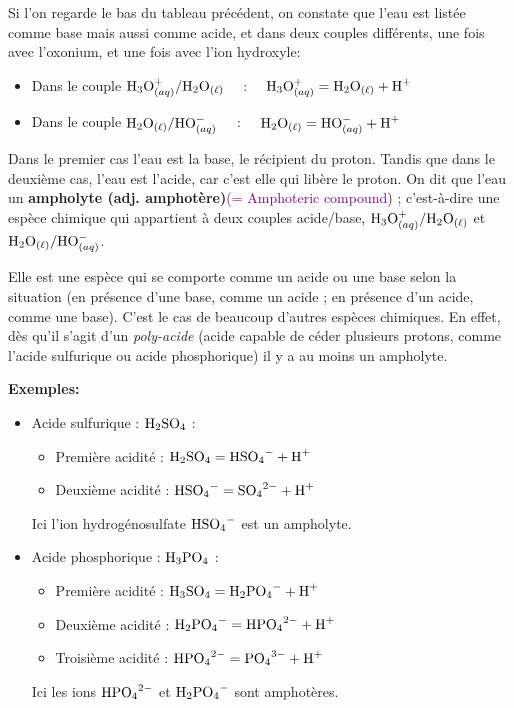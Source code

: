 \documentclass[11pt,a4paper]{article}
\newcommand{\eng}[1]{\textcolor{purple}{(= #1})}
\newcommand{\oxo}{\ce{H3O+}_{(aq)}}
\newcommand{\eau}{\ce{H2O}_{(\ell)}}
\newcommand{\OH}{\ce{HO-}_{(aq)}}
\newenvironment{eg}
 {\begin{shaded} \textbf{Exemples:} } { \end{shaded}}
\begin{document}
Si l'on regarde le bas du tableau précédent, on constate que l'eau est listée comme base mais aussi comme acide, et dans deux couples différents, une fois avec l'oxonium, et une fois avec l'ion hydroxyle: 

\begin{itemize}
    \item Dans le couple $ \oxo/\eau \quad$ : $\quad \oxo = \eau + \ce{H+}$
    \item Dans le couple $ \eau / \OH \quad $ : $\quad \eau = \OH + \ce{H+}$
\end{itemize}

Dans le premier cas l’eau est la base, le récipient du proton.  Tandis que dans le deuxième cas, l’eau est l’acide, car c’est elle qui libère le proton.  On dit que l’eau un \textbf{ampholyte (adj. amphotère)}\eng{Amphoteric compound} ;  c'est-à-dire une espèce chimique qui appartient à deux couples acide/base, $ \oxo/\eau$ et $ \eau / \OH$.  

Elle est une espèce qui se comporte comme un acide ou une base selon la situation (en présence d’une base, comme un acide ; en présence d’un acide, comme une base). C'est le cas de beaucoup d'autres espèces chimiques. En effet, dès qu'il s'agit d'un \emph{poly-acide} (acide capable de céder plusieurs protons, comme l'acide sulfurique ou acide phosphorique) il y a au moins un ampholyte. 

\begin{eg} %
\begin{itemize}
    \item Acide sulfurique : $\ce{H2SO4}$ : 
    \begin{itemize}
        \item Première acidité : $\ce{H2SO4} = \ce{HSO4-} + \ce{H+}$
        \item Deuxième acidité : $\ce{HSO4-} = \ce{SO4^2-} + \ce{H+}$
    \end{itemize}
    Ici l'ion hydrogénosulfate $\ce{HSO4-}$ est un ampholyte. 
    \item Acide phosphorique : $\ce{H3PO4}$ : 
    \begin{itemize}
        \item Première acidité : $\ce{H3SO4} = \ce{H2PO4-} + \ce{H+}$
        \item Deuxième acidité : $\ce{H2PO4-} = \ce{HPO4^2-} + \ce{H+}$
        \item Troisième acidité : $\ce{HPO4^2-} = \ce{PO4^3-} + \ce{H+}$
    \end{itemize}    
    Ici les ions $\ce{HPO4^2-}$ et $\ce{H2PO4-}$ sont amphotères. 
\end{itemize}
\end{eg}
\end{document}
